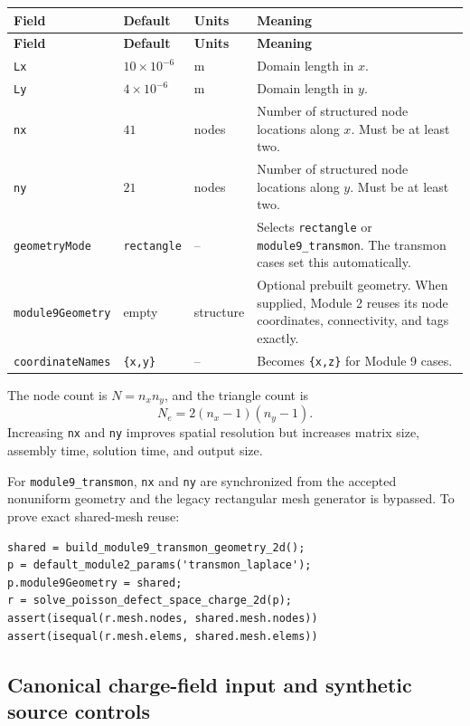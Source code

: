 \documentclass[11pt]{article}
\begin{document}
\begin{longtable}{p{} p{} p{} p{}}
\toprule
\textbf{Field} & \textbf{Default} & \textbf{Units} & \textbf{Meaning} \\
\midrule
\endfirsthead
\toprule
\textbf{Field} & \textbf{Default} & \textbf{Units} & \textbf{Meaning} \\
\midrule
\endhead
\texttt{Lx} & $10\times10^{-6}$ & m & Domain length in $x$. \\
\texttt{Ly} & $4\times10^{-6}$ & m & Domain length in $y$. \\
\texttt{nx} & $41$ & nodes & Number of structured node locations along $x$. Must be at least two. \\
\texttt{ny} & $21$ & nodes & Number of structured node locations along $y$. Must be at least two. \\
\texttt{geometryMode} & \texttt{rectangle} & -- & Selects \texttt{rectangle} or \texttt{module9\_transmon}. The transmon cases set this automatically. \\
\texttt{module9Geometry} & empty & structure & Optional prebuilt geometry. When supplied, Module 2 reuses its node coordinates, connectivity, and tags exactly. \\
\texttt{coordinateNames} & \texttt{\{x,y\}} & -- & Becomes \texttt{\{x,z\}} for Module 9 cases. \\
\bottomrule
\end{longtable}
The node count is $N= n_xn_y$, and the triangle count is
\begin{equation}
N_e=2(n_x-1)(n_y-1).
\end{equation}
Increasing \texttt{nx} and \texttt{ny} improves spatial resolution but increases matrix size, assembly time, solution time, and output size.

For \texttt{module9\_transmon}, \texttt{nx} and \texttt{ny} are synchronized from the accepted nonuniform geometry and the legacy rectangular mesh generator is bypassed. To prove exact shared-mesh reuse:
\begin{lstlisting}[style=projectmatlab]
shared = build_module9_transmon_geometry_2d();
p = default_module2_params('transmon_laplace');
p.module9Geometry = shared;
r = solve_poisson_defect_space_charge_2d(p);
assert(isequal(r.mesh.nodes, shared.mesh.nodes))
assert(isequal(r.mesh.elems, shared.mesh.elems))
\end{lstlisting}

\subsection{Canonical charge-field input and synthetic source controls}
\end{document}
